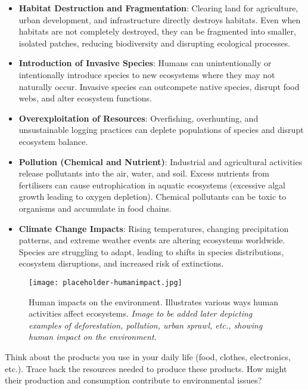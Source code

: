 \begin{itemize}
    \item \textbf{Habitat Destruction and Fragmentation}:  Clearing land for agriculture, urban development, and infrastructure directly destroys habitats.  Even when habitats are not completely destroyed, they can be fragmented into smaller, isolated patches, reducing biodiversity and disrupting ecological processes.
    \item \textbf{Introduction of Invasive Species}:  Humans can unintentionally or intentionally introduce species to new ecosystems where they may not naturally occur. Invasive species can outcompete native species, disrupt food webs, and alter ecosystem functions.
    \item \textbf{Overexploitation of Resources}:  Overfishing, overhunting, and unsustainable logging practices can deplete populations of species and disrupt ecosystem balance.
    \item \textbf{Pollution (Chemical and Nutrient)}:  Industrial and agricultural activities release pollutants into the air, water, and soil.  Excess nutrients from fertilisers can cause eutrophication in aquatic ecosystems (excessive algal growth leading to oxygen depletion). Chemical pollutants can be toxic to organisms and accumulate in food chains.
    \item \textbf{Climate Change Impacts}:  Rising temperatures, changing precipitation patterns, and extreme weather events are altering ecosystems worldwide. Species are struggling to adapt, leading to shifts in species distributions, ecosystem disruptions, and increased risk of extinctions.
\end{itemize}

\begin{figure}[h]
    \texttt{[image: placeholder-humanimpact.jpg]}
    \caption{Human impacts on the environment.  Illustrates various ways human activities affect ecosystems. \textit{Image to be added later depicting examples of deforestation, pollution, urban sprawl, etc., showing human impact on the environment.}}
\end{figure}

\begin{stopandthink}
Think about the products you use in your daily life (food, clothes, electronics, etc.).  Trace back the resources needed to produce these products.  How might their production and consumption contribute to environmental issues?
\end{stopandthink}

